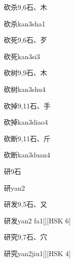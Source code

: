 \begin{Entry}{砍杀}{9,6}{⽯、⽊}
  \begin{Phonetics}{砍杀}{kan3sha1}
  \end{Phonetics}
\end{Entry}

\begin{Entry}{砍死}{9,6}{⽯、⽍}
  \begin{Phonetics}{砍死}{kan3si3}
  \end{Phonetics}
\end{Entry}

\begin{Entry}{砍树}{9,9}{⽯、⽊}
  \begin{Phonetics}{砍树}{kan3shu4}
  \end{Phonetics}
\end{Entry}

\begin{Entry}{砍掉}{9,11}{⽯、⼿}
  \begin{Phonetics}{砍掉}{kan3diao4}
  \end{Phonetics}
\end{Entry}

\begin{Entry}{砍断}{9,11}{⽯、⽄}
  \begin{Phonetics}{砍断}{kan3duan4}
  \end{Phonetics}
\end{Entry}

\begin{Entry}{研}{9}{⽯}
  \begin{Phonetics}{研}{yan2}
  \end{Phonetics}
\end{Entry}

\begin{Entry}{研发}{9,5}{⽯、⼜}
  \begin{Phonetics}{研发}{yan2 fa1}[][HSK 6]
  \end{Phonetics}
\end{Entry}

\begin{Entry}{研究}{9,7}{⽯、⽳}
  \begin{Phonetics}{研究}{yan2jiu1}[][HSK 4]
  \end{Phonetics}
\end{Entry}

